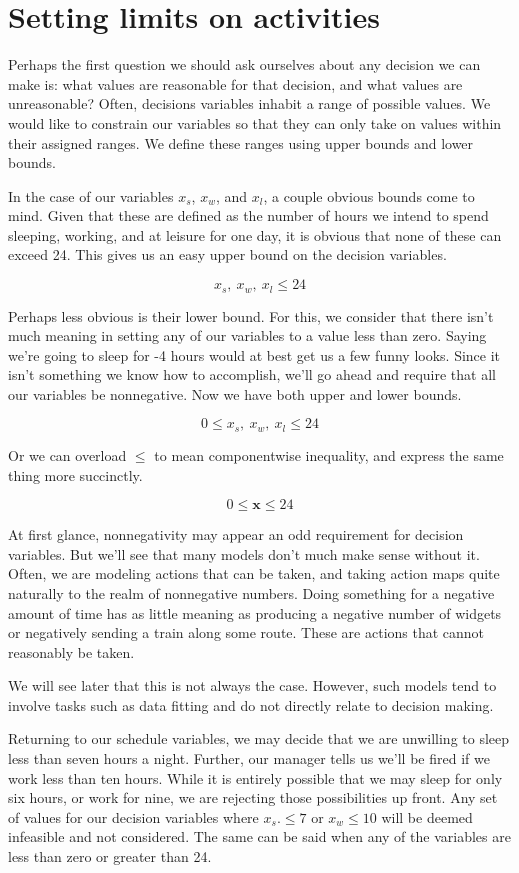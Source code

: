 \section{Setting limits on activities}

Perhaps the first question we should ask ourselves about any decision we can make is: what values are reasonable for that decision, and what values are unreasonable? Often, decisions variables inhabit a range of possible values. We would like to constrain our variables so that they can only take on values within their assigned ranges. We define these ranges using upper bounds and lower bounds.

In the case of our variables $x_s$, $x_w$, and $x_l$, a couple obvious bounds come to mind. Given that these are defined as the number of hours we intend to spend sleeping, working, and at leisure for one day, it is obvious that none of these can exceed 24. This gives us an easy upper bound on the decision variables.

$$x_s,\ x_w,\ x_l \le 24$$

Perhaps less obvious is their lower bound. For this, we consider that there isn't much meaning in setting any of our variables to a value less than zero. Saying we're going to sleep for -4 hours would at best get us a few funny looks. Since it isn't something we know how to accomplish, we'll go ahead and require that all our variables be nonnegative. Now we have both upper and lower bounds.

$$0 \le x_s,\ x_w,\ x_l \le 24$$

Or we can overload $\le$ to mean componentwise inequality, and express the same thing more succinctly.

$$0 \le \mathbf{x} \le 24$$

At first glance, nonnegativity may appear an odd requirement for decision variables. But we'll see that many models don't much make sense without it. Often, we are modeling actions that can be taken, and taking action maps quite naturally to the realm of nonnegative numbers. Doing something for a negative amount of time has as little meaning as producing a negative number of widgets or negatively sending a train along some route. These are actions that cannot reasonably be taken.

We will see later that this is not always the case. However, such models tend to involve tasks such as data fitting and do not directly relate to decision making.

Returning to our schedule variables, we may decide that we are unwilling to sleep less than seven hours a night. Further, our manager tells us we'll be fired if we work less than ten hours. While it is entirely possible that we may sleep for only six hours, or work for nine, we are rejecting those possibilities up front. Any set of values for our decision variables where $x_s.\le 7$  or $x_w \le 10$ will be deemed infeasible and not considered. The same can be said when any of the variables are less than zero or greater than 24.

